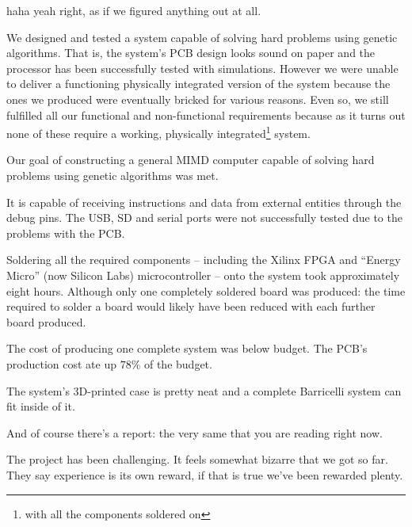 haha yeah right, as if we figured anything out at all.




We designed and tested a system capable of solving hard problems using genetic algorithms.
That is, the system's PCB design looks sound on paper and the processor has been successfully tested with simulations.
However we were unable to deliver a functioning physically integrated version of the system because the ones we produced were eventually bricked for various reasons.
Even so, we still fulfilled all our functional and non-functional requirements because as it turns out none of these require a working, physically integrated\footnote{with all the components soldered on} system.

Our goal of constructing a general MIMD computer capable of solving hard problems using genetic algorithms was met.

It is capable of receiving instructions and data from external entities through the debug pins.
The USB, SD and serial ports were not successfully tested due to the problems with the PCB.




Soldering all the required components -- including the Xilinx FPGA and ``Energy Micro'' (now Silicon Labs) microcontroller --  onto the system took approximately eight hours.
Although only one completely soldered board was produced: the time required to solder a board would likely have been reduced with each further board produced.

The cost of producing one complete system was below budget.
The PCB's production cost ate up $78\%$ of the budget.

The system's 3D-printed case is pretty neat and a complete Barricelli system can fit inside of it. 


And of course there's a report: the very same that you are reading right now.

The project has been challenging.
It feels somewhat bizarre that we got so far.
They say experience is its own reward, if that is true we've been rewarded plenty.

